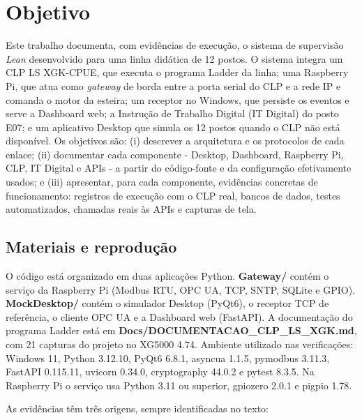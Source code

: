 \section{Objetivo}

Este trabalho documenta, com evidências de execução, o sistema de supervisão \textit{Lean} desenvolvido para uma linha didática de 12 postos. O sistema integra um CLP LS XGK-CPUE, que executa o programa Ladder da linha; uma Raspberry Pi, que atua como \textit{gateway} de borda entre a porta serial do CLP e a rede IP e comanda o motor da esteira; um receptor no Windows, que persiste os eventos e serve a Dashboard web; a Instrução de Trabalho Digital (IT Digital) do posto E07; e um aplicativo Desktop que simula os 12 postos quando o CLP não está disponível. Os objetivos são: (i) descrever a arquitetura e os protocolos de cada enlace; (ii) documentar cada componente - Desktop, Dashboard, Raspberry Pi, CLP, IT Digital e APIs - a partir do código-fonte e da configuração efetivamente usados; e (iii) apresentar, para cada componente, evidências concretas de funcionamento: registros de execução com o CLP real, bancos de dados, testes automatizados, chamadas reais às APIs e capturas de tela.

\subsection{Materiais e reprodução}

O código está organizado em duas aplicações Python. \textbf{Gateway/} contém o serviço da Raspberry Pi (Modbus RTU, OPC UA, TCP, SNTP, SQLite e GPIO). \textbf{MockDesktop/} contém o simulador Desktop (PyQt6), o receptor TCP de referência, o cliente OPC UA e a Dashboard web (FastAPI). A documentação do programa Ladder está em \textbf{Docs/DOCUMENTACAO\_CLP\_LS\_XGK.md}, com 21 capturas do projeto  no XG5000 4.74. Ambiente utilizado nas verificações: Windows 11, Python 3.12.10, PyQt6 6.8.1, asyncua 1.1.5, pymodbus 3.11.3, FastAPI 0.115.11, uvicorn 0.34.0, cryptography 44.0.2 e pytest 8.3.5. Na Raspberry Pi o serviço usa Python 3.11 ou superior, gpiozero 2.0.1 e pigpio 1.78.

As evidências têm três origens, sempre identificadas no texto:

